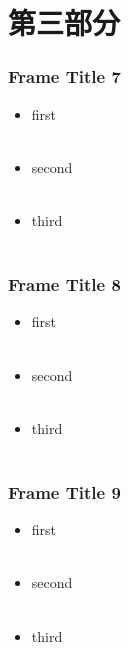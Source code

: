 \documentclass[10pt,aspectratio=43]{beamer} %
\begin{document}
	\section{第三部分}
	\begin{frame}
		\frametitle{Frame Title 7}
		\begin{itemize} 
			\item first \\~\\
			\item second \\~\\
			\item third \\~\\
		\end{itemize}
	\end{frame}
	\begin{frame}
		\frametitle{Frame Title 8}
		\begin{itemize} 
			\item first \\~\\
			\item second \\~\\
			\item third \\~\\
		\end{itemize}
	\end{frame}
	\begin{frame}
		\frametitle{Frame Title 9}
		\begin{itemize} 
			\item first \\~\\
			\item second \\~\\
			\item third \\~\\
		\end{itemize}
	\end{frame}
\end{document}
